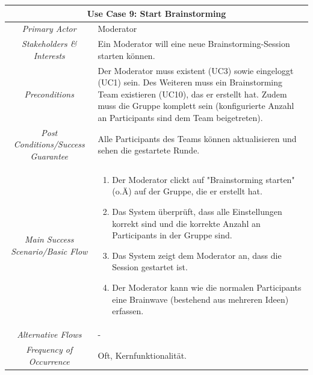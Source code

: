 \renewcommand{\arraystretch}{1.35}
\begin{center}
	\begin{longtable}{| c | p{7cm} |}
		\hline
		\multicolumn{2}{|c|}{\textbf{Use Case 9: Start Brainstorming}}\\
		\hline\hline
		\textit{Primary Actor} & Moderator\\
		\hline
		\textit{Stakeholders \& Interests} & Ein Moderator will eine neue Brainstorming-Session starten können. \\
		\hline
		\textit{Preconditions} & Der Moderator muss existent (UC3) sowie eingeloggt (UC1) sein. Des Weiteren muss ein Brainstorming Team existieren (UC10), das er erstellt hat. Zudem muss die Gruppe komplett sein (konfigurierte Anzahl an Participants sind dem Team beigetreten). \\
		\hline
		\textit{Post Conditions/Success Guarantee} & Alle Participants des Teams können aktualisieren und sehen die gestartete Runde. \\
		\hline
		\textit{Main Success Scenario/Basic Flow} & 
		\begin{enumerate}[noitemsep]
			\item Der Moderator clickt auf "Brainstorming starten" (o.Ä) auf der Gruppe, die er erstellt hat. 
			\item Das System überprüft, dass alle Einstellungen korrekt sind und die korrekte Anzahl an Participants in der Gruppe sind. 
			\item Das System zeigt dem Moderator an, dass die Session gestartet ist.
			\item Der Moderator kann wie die normalen Participants eine Brainwave (bestehend aus mehreren Ideen) erfassen.
		\end{enumerate}\\
		\hline
		\textit{Alternative Flows} & -\\
		
		\hline
		
		\textit{Frequency of Occurrence} & Oft, Kernfunktionalität.\\
		
		\hline
	\end{longtable}
\end{center}




